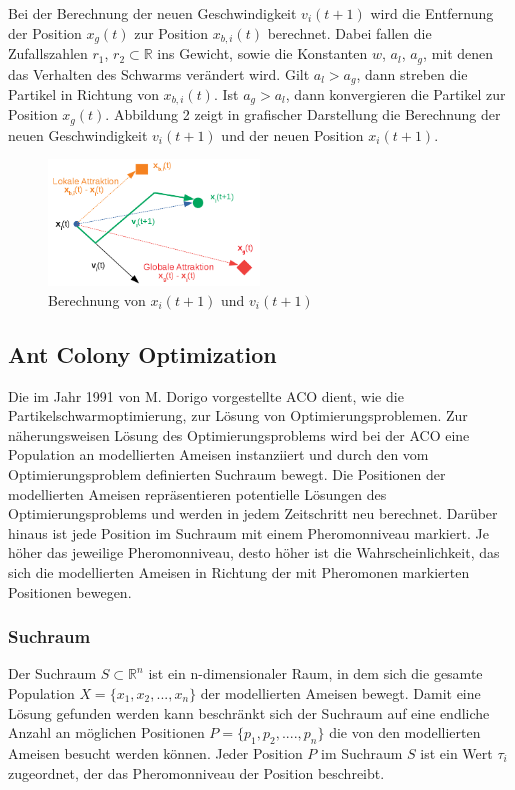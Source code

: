 \documentclass[a4paper, 11pt]{article}
\begin{document}
\par Bei der Berechnung der neuen Geschwindigkeit $v_{i}(t+1)$ wird die Entfernung der Position  $x_{g}(t)$ zur Position $x_{b,i}(t)$ berechnet. Dabei fallen die Zufallszahlen $r_{1}$, $r_{2} \subset \mathbb{R}$ ins Gewicht, sowie die Konstanten $w$, $a_{l}$, $a_{g}$, mit denen das Verhalten des Schwarms verändert wird. Gilt $a_{l} > a_{g}$, dann streben die Partikel in Richtung von $x_{b,i}(t)$. Ist $a_{g} > a_{l}$, dann konvergieren die Partikel zur Position $x_{g}(t)$. Abbildung 2 zeigt in grafischer Darstellung die Berechnung der neuen Geschwindigkeit $v_{i}(t+1)$ und der neuen Position $x_{i}(t+1)$.
\begin{figure}[h]
	\begin{center}
		\includegraphics[width=0.50\textwidth]{pso}
	\end{center}
	\hspace{1in}\parbox{4in}{\caption[\acs{PSO}, Berechnung von $x_{i}(t+1)$ und $v_{i}(t+1)$]{Berechnung von $x_{i}(t+1)$ und $v_{i}(t+1)$}}
	\label{psoabb}
\end{figure}
\newpage
\subsection{Ant Colony Optimization}
Die im Jahr 1991 von M. Dorigo vorgestellte \ac{ACO} dient, wie die Partikelschwarmoptimierung, zur Lösung von Optimierungsproblemen. Zur näherungsweisen Lösung des Optimierungsproblems wird bei der \acs{ACO} eine Population an modellierten Ameisen instanziiert und durch den vom Optimierungsproblem definierten Suchraum bewegt. Die Positionen der modellierten Ameisen repräsentieren potentielle Lösungen des Optimierungsproblems und werden in jedem Zeitschritt neu berechnet. Darüber hinaus ist jede Position im Suchraum mit einem Pheromonniveau markiert. Je höher das jeweilige Pheromonniveau, desto höher ist die Wahrscheinlichkeit, das sich die modellierten Ameisen in Richtung der mit Pheromonen markierten Positionen bewegen.
\subsubsection{Suchraum}
Der Suchraum $S \subset \mathbb{R}^n$ ist ein n-dimensionaler Raum, in dem sich die gesamte Population $X=\{x_{1},x_{2},...,x_{n}\}$ der modellierten Ameisen bewegt. Damit eine Lösung gefunden werden kann beschränkt sich der Suchraum auf eine endliche Anzahl an möglichen Positionen $P=\{p_{1},p_{2},....,p_{n}\}$ die von den modellierten Ameisen besucht werden können. Jeder Position $P$ im Suchraum $S$ ist ein Wert $\tau_{i}$ zugeordnet, der das Pheromonniveau der Position beschreibt.
\end{document}

